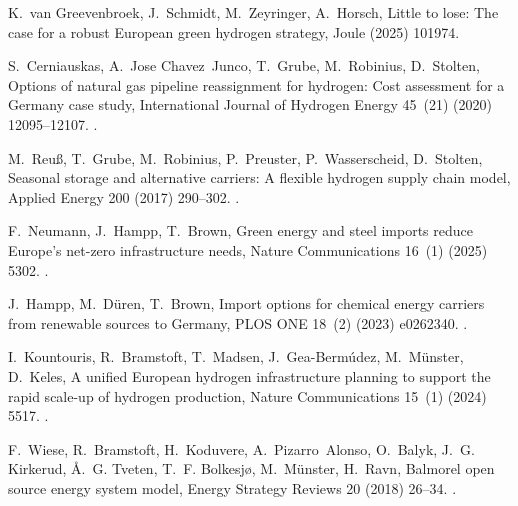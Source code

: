 \documentclass[preprint,12pt,sort&compress]{elsarticle}
\begin{document}
\begin{thebibliography}{10}
K.~{van Greevenbroek}, J.~Schmidt, M.~Zeyringer, A.~Horsch, Little to lose: {{The}} case for a robust {{European}} green hydrogen strategy, Joule (2025) 101974\href {https://doi.org/10.1016/j.joule.2025.101974} {}.

S.~Cerniauskas, A.~Jose Chavez~Junco, T.~Grube, M.~Robinius, D.~Stolten, Options of natural gas pipeline reassignment for hydrogen: {{Cost}} assessment for a {{Germany}} case study, International Journal of Hydrogen Energy 45~(21) (2020) 12095--12107.
\newblock \href {https://doi.org/10.1016/j.ijhydene.2020.02.121} {}.

M.~Reu{\ss}, T.~Grube, M.~Robinius, P.~Preuster, P.~Wasserscheid, D.~Stolten, Seasonal storage and alternative carriers: {{A}} flexible hydrogen supply chain model, Applied Energy 200 (2017) 290--302.
\newblock \href {https://doi.org/10.1016/j.apenergy.2017.05.050} {}.

F.~Neumann, J.~Hampp, T.~Brown, Green energy and steel imports reduce {{Europe}}'s net-zero infrastructure needs, Nature Communications 16~(1) (2025) 5302.
\newblock \href {https://doi.org/10.1038/s41467-025-60652-1} {}.

J.~Hampp, M.~D{\"u}ren, T.~Brown, Import options for chemical energy carriers from renewable sources to {{Germany}}, PLOS ONE 18~(2) (2023) e0262340.
\newblock \href {https://doi.org/10.1371/journal.pone.0281380} {}.

I.~Kountouris, R.~Bramstoft, T.~Madsen, J.~{Gea-Berm{\'u}dez}, M.~M{\"u}nster, D.~Keles, A unified {{European}} hydrogen infrastructure planning to support the rapid scale-up of hydrogen production, Nature Communications 15~(1) (2024) 5517.
\newblock \href {https://doi.org/10.1038/s41467-024-49867-w} {}.

F.~Wiese, R.~Bramstoft, H.~Koduvere, A.~Pizarro~Alonso, O.~Balyk, J.~G. Kirkerud, {\AA}.~G. Tveten, T.~F. Bolkesj{\o}, M.~M{\"u}nster, H.~Ravn, Balmorel open source energy system model, Energy Strategy Reviews 20 (2018) 26--34.
\newblock \href {https://doi.org/10.1016/j.esr.2018.01.003} {}.


\end{thebibliography}
\end{document}
